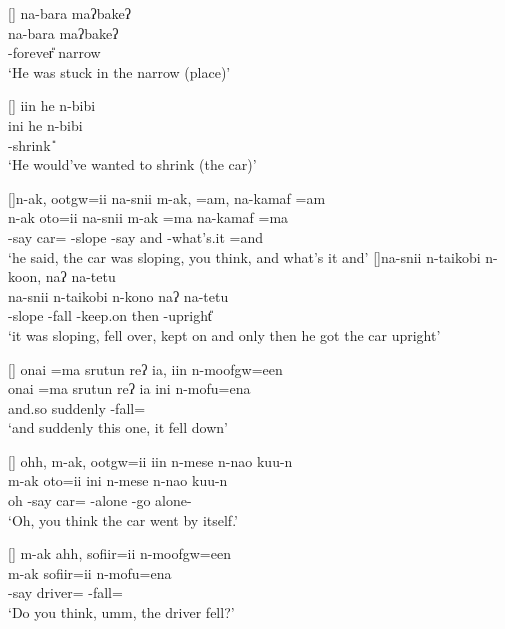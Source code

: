 \begin{exe}
[]{\glll
	na-bara maʔbakeʔ \\
	na-bara maʔbakeʔ \\
	\na-forever{\U} narrow \\
\glt `He was stuck in the narrow (place)' }

\vspace{-4pt}
[]{\glll
	iin he n-bibi \\
	ini he n-bibi \\
	{\iin} {\he} \n-shrink {\U} \\
\glt `He would've wanted to shrink (the car)'}

[]{\glll	n-ak, ootgw=ii na-snii m-ak, =am, na-kamaf =am\\
										n-ak oto=ii na-snii m-ak =ma na-kamaf =ma\\
										\n-say car={\ii} \na-slope \m-say and \na-what's.it =and\\
							\glt	`he said, the car was sloping, you think, and what's it and'}
[]{\glll	na-snii n-taikobi n-koon, naʔ na-tetu\-snii n-taikobi n-kono naʔ na-tetu\\
										\na-slope \n-fall \n-keep.on then \nat-upright{\U}\\
							\glt	`it was sloping, fell over, kept on and only then he got the car upright' }

[]{\glll
	{onai =ma} srutun reʔ ia, iin n-moofgw=een \\
	{onai =ma} srutun reʔ ia ini n-mofu=ena \\
	and.so suddenly {\req} {\ia} {\iin} \n-fall={\een} \\
\glt `and suddenly this one, it fell down'}

\vspace{-4pt}
[]{\glll
	ohh, m-ak, ootgw=ii iin n-mese n-nao kuu-n \\
	{} m-ak oto=ii ini n-mese n-nao kuu-n \\
	oh \m-say car={\ii} {\iin} \n-alone \n-go alone-{\N} \\
\glt `Oh, you think the car went by itself.'}

[]{\glll
	m-ak ahh, sofiir=ii n-moofgw=een\\
	m-ak {} sofiir=ii n-mofu=ena\\
	\m-say {} driver={\ii} \n-fall={\een} \\
\glt `Do you think, umm, the driver fell?' }


\end{exe}
